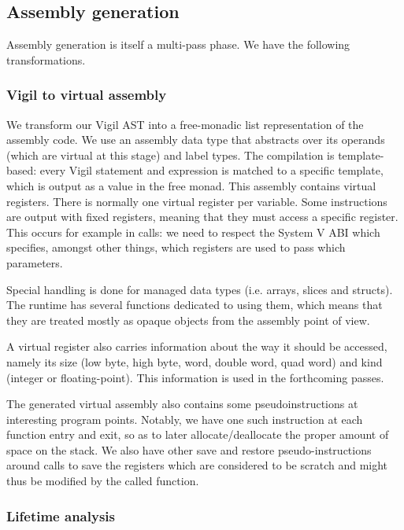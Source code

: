\documentclass[letterpaper,11pt]{article}
\begin{document}
\subsection{Assembly generation}
\label{sec:ph_gen}

Assembly generation is itself a multi-pass phase. We have the following transformations.

\subsubsection{Vigil to virtual assembly}
\label{sec:vasm}

We transform our Vigil AST into a free-monadic list representation of the assembly code. We use an assembly data type that abstracts over its operands (which are virtual at this stage) and label types. The compilation is template-based: every Vigil statement and expression is matched to a specific template, which is output as a value in the free monad. This assembly contains virtual registers. There is normally one virtual register per variable. Some instructions are output with fixed registers, meaning that they must access a specific register. This occurs for example in calls: we need to respect the System V ABI which specifies, amongst other things, which registers are used to pass which parameters.

Special handling is done for managed data types (i.e. arrays, slices and structs). The runtime has several functions dedicated to using them, which means that they are treated mostly as opaque objects from the assembly point of view.

A virtual register also carries information about the way it should be accessed, namely its size (low byte, high byte, word, double word, quad word) and kind (integer or floating-point). This information is used in the forthcoming passes.

The generated virtual assembly also contains some pseudoinstructions at interesting program points. Notably, we have one such instruction at each function entry and exit, so as to later allocate/deallocate the proper amount of space on the stack. We also have other save and restore pseudo-instructions around calls to save the registers which are considered to be scratch and might thus be modified by the called function.

\subsubsection{Lifetime analysis}
\end{document}
